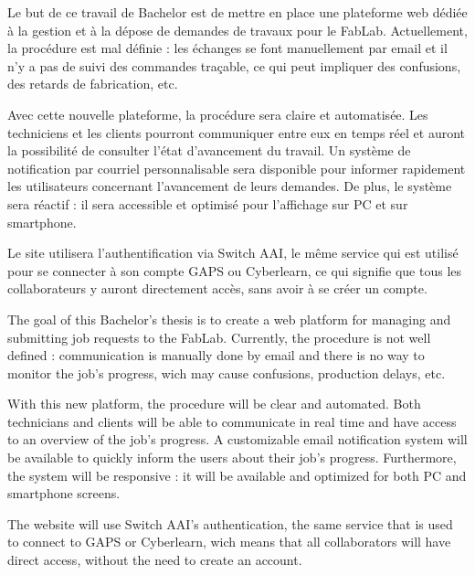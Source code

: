 Le but de ce travail de Bachelor est de mettre en place une plateforme web dédiée à la gestion et à la dépose de demandes de travaux pour le FabLab.
Actuellement, la procédure est mal définie : les échanges se font manuellement par email et il n'y a pas de suivi des commandes traçable, ce qui peut impliquer des confusions, des retards de fabrication, etc.

Avec cette nouvelle plateforme, la procédure sera claire et automatisée.
Les techniciens et les clients pourront communiquer entre eux en temps réel et auront la possibilité de consulter l'état d'avancement du travail.
Un système de notification par courriel personnalisable sera disponible pour informer rapidement les utilisateurs concernant l'avancement de leurs demandes.
De plus, le système sera réactif : il sera accessible et optimisé pour l'affichage sur PC et sur smartphone.

Le site utilisera l'authentification via Switch AAI, le même service qui est utilisé pour se connecter à son compte GAPS ou Cyberlearn, ce qui signifie que tous les collaborateurs y auront directement accès, sans avoir à se créer un compte.

\asterism

The goal of this Bachelor's thesis is to create a web platform for managing and submitting job requests to the FabLab.
Currently, the procedure is not well defined : communication is manually done by email and there is no way to monitor the job's progress, wich may cause confusions, production delays, etc.

With this new platform, the procedure will be clear and automated.
Both technicians and clients will be able to communicate in real time and have access to an overview of the job's progress.
A customizable email notification system will be available to quickly inform the users about their job's progress.
Furthermore, the system will be responsive : it will be available and optimized for both PC and smartphone screens.

The website will use Switch AAI's authentication, the same service that is used to connect to GAPS or Cyberlearn, wich means that all collaborators will have direct access, without the need to create an account.